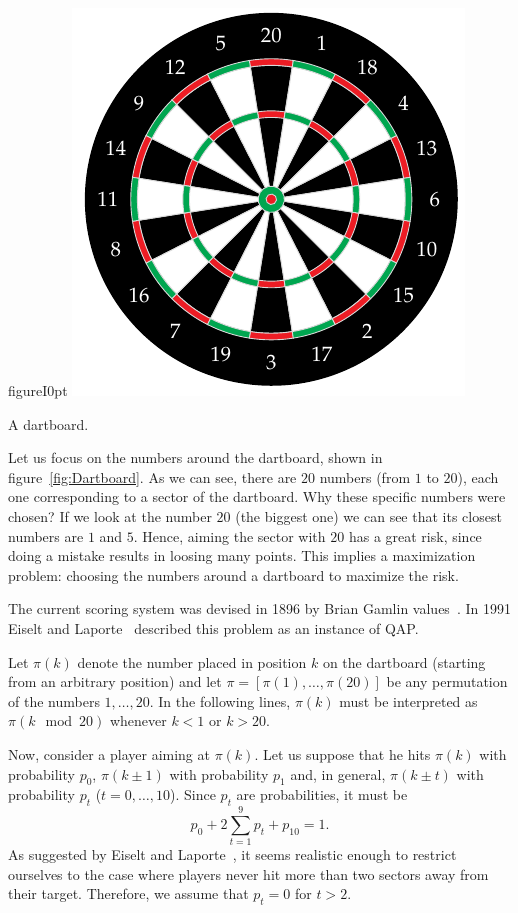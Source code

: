 \begin{wrapfloat}{figure}{I}{0pt}
	\vspace{-10pt}	
	\centering
	\includegraphics[width=.40\textwidth]{dartboard}
	\caption{A dartboard.}
	\label{fig:Dartboard}
	\vspace{-10pt}		
\end{wrapfloat}
 Let us focus on the numbers around the dartboard,  shown in figure~\ref{fig:Dartboard}. As we can see, there are $20$ numbers (from $1$ to $20$), each one corresponding to a sector of the dartboard. Why  these specific numbers were  chosen? If we look at the number $20$ (the biggest one) we can see that its closest numbers are $1$ and $5$. Hence, aiming the sector with $20$ has a great risk, since doing a mistake results in loosing many points.
This implies a maximization problem: choosing the numbers around a dartboard to maximize the risk. 


The current scoring system
was devised in 1896 by Brian Gamlin values~\cite{Eiselt1991}. In 1991 Eiselt and Laporte~\cite{Eiselt1991} described this problem as an instance of QAP. 

 Let $\pi(k)$ denote the number placed in position $k$ on the dartboard (starting from an arbitrary position) and let $\pi = [\pi(1), \dots , \pi(20)]$ be any permutation of the numbers $1,\dots , 20$.  In the following lines,  $\pi(k)$ must be interpreted as $\pi(k \mod 20)$ whenever $k < 1$ or $k > 20$.

 Now, consider a player aiming at $\pi(k)$. Let us suppose that he hits $\pi(k)$ with probability $p_0$, $\pi(k \pm 1)$ with probability $p_1$ and, in general,  $\pi(k\pm t)$ with probability $p_t$ ($t=0,\dots,10$). Since $p_t$ are probabilities, it must be 
\begin{equation}
	\label{eq:dart}
p_0  +2\sum_{t=1}^9 p_t+p_{10}=1.
\end{equation}
As suggested by Eiselt and Laporte~\cite{Eiselt1991}, it seems realistic enough to
restrict ourselves to the case where players never hit more than two sectors away from their target. Therefore, we assume  that $p_t=0$ for $t > 2$. 


